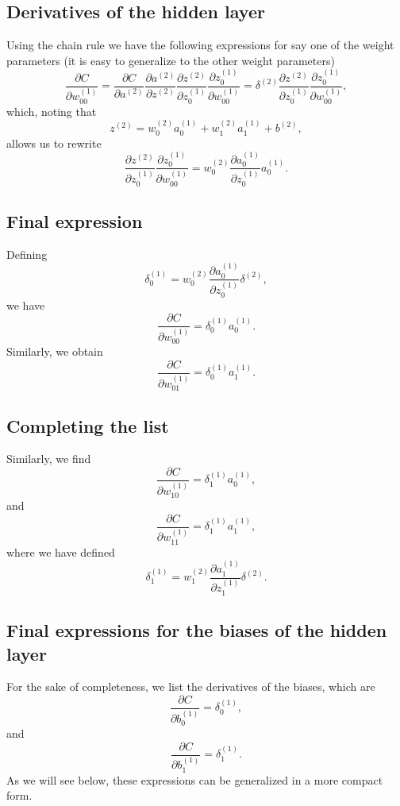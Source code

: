 \documentclass[%
oneside,                 %
final,                   %
10pt]{article}
\begin{document}
\subsection{Derivatives of the hidden layer}

Using the chain rule we have the following expressions for say one of the weight parameters (it is easy to generalize to the other weight parameters)
\[
\frac{\partial C}{\partial w_{00}^{(1)}}=\frac{\partial C}{\partial a^{(2)}}\frac{\partial a^{(2)}}{\partial z^{(2)}}
\frac{\partial z^{(2)}}{\partial z_0^{(1)}}\frac{\partial z_0^{(1)}}{\partial w_{00}^{(1)}}=    \delta^{(2)}\frac{\partial z^{(2)}}{\partial z_0^{(1)}}\frac{\partial z_0^{(1)}}{\partial w_{00}^{(1)}},
\]
which, noting that
\[
z^{(2)} =w_0^{(2)}a_0^{(1)}+w_1^{(2)}a_1^{(1)}+b^{(2)},
\]
allows us to rewrite 
\[
\frac{\partial z^{(2)}}{\partial z_0^{(1)}}\frac{\partial z_0^{(1)}}{\partial w_{00}^{(1)}}=w_0^{(2)}\frac{\partial a_0^{(1)}}{\partial z_0^{(1)}}a_0^{(1)}.
\]

\subsection{Final expression}
Defining
\[
\delta_0^{(1)}=w_0^{(2)}\frac{\partial a_0^{(1)}}{\partial z_0^{(1)}}\delta^{(2)},
\]
we have 
\[
\frac{\partial C}{\partial w_{00}^{(1)}}=\delta_0^{(1)}a_0^{(1)}.
\]
Similarly, we obtain
\[
\frac{\partial C}{\partial w_{01}^{(1)}}=\delta_0^{(1)}a_1^{(1)}.
\]

\subsection{Completing the list}

Similarly, we find
\[
\frac{\partial C}{\partial w_{10}^{(1)}}=\delta_1^{(1)}a_0^{(1)},
\]
and 
\[
\frac{\partial C}{\partial w_{11}^{(1)}}=\delta_1^{(1)}a_1^{(1)},
\]
where we have defined 
\[
\delta_1^{(1)}=w_1^{(2)}\frac{\partial a_1^{(1)}}{\partial z_1^{(1)}}\delta^{(2)}.
\]

\subsection{Final expressions for the biases of the hidden layer}

For the sake of completeness, we list the derivatives of the biases, which are
\[
\frac{\partial C}{\partial b_{0}^{(1)}}=\delta_0^{(1)},
\]
and
\[
\frac{\partial C}{\partial b_{1}^{(1)}}=\delta_1^{(1)}.
\]
As we will see below, these expressions can be generalized in a more compact form. 
\end{document}
